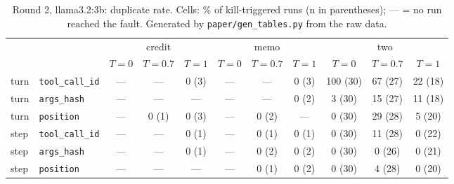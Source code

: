 \begin{table}[t]
\centering
\small
\begin{tabular}{llccccccccc}
\toprule
 & & \multicolumn{3}{c}{credit} & \multicolumn{3}{c}{memo} & \multicolumn{3}{c}{two} \\
 & & $T{=}0$ & $T{=}0.7$ & $T{=}1$ & $T{=}0$ & $T{=}0.7$ & $T{=}1$ & $T{=}0$ & $T{=}0.7$ & $T{=}1$ \\
\midrule
turn & \texttt{tool\_call\_id} & --- & --- & 0 {\scriptsize(3)} & --- & --- & 0 {\scriptsize(3)} & 100 {\scriptsize(30)} & 67 {\scriptsize(27)} & 22 {\scriptsize(18)} \\
turn & \texttt{args\_hash} & --- & --- & --- & --- & --- & 0 {\scriptsize(2)} & 3 {\scriptsize(30)} & 15 {\scriptsize(27)} & 11 {\scriptsize(18)} \\
turn & \texttt{position} & --- & 0 {\scriptsize(1)} & 0 {\scriptsize(3)} & --- & 0 {\scriptsize(2)} & --- & 0 {\scriptsize(30)} & 29 {\scriptsize(28)} & 5 {\scriptsize(20)} \\
\midrule
step & \texttt{tool\_call\_id} & --- & --- & 0 {\scriptsize(1)} & --- & 0 {\scriptsize(1)} & 0 {\scriptsize(1)} & 0 {\scriptsize(30)} & 11 {\scriptsize(28)} & 0 {\scriptsize(22)} \\
step & \texttt{args\_hash} & --- & --- & 0 {\scriptsize(1)} & --- & 0 {\scriptsize(2)} & 0 {\scriptsize(2)} & 0 {\scriptsize(30)} & 0 {\scriptsize(26)} & 0 {\scriptsize(21)} \\
step & \texttt{position} & --- & --- & --- & --- & 0 {\scriptsize(1)} & 0 {\scriptsize(2)} & 0 {\scriptsize(30)} & 4 {\scriptsize(28)} & 0 {\scriptsize(20)} \\
\bottomrule
\end{tabular}
\caption{Round 2, llama3.2:3b: duplicate rate. Cells: \% of kill-triggered runs (n in parentheses); --- = no run reached the fault. Generated by \texttt{paper/gen\_tables.py} from the raw data.}
\label{tab:r2dupllama}
\end{table}


